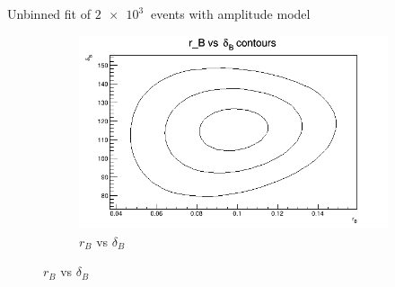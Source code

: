 \documentclass{beamer}
\begin{document}
\begin{frame}{Unbinned fit of $\SI{2e3}{}$ events with amplitude model}
\begin{figure}
\begin{subfigure}{0.46\textwidth}
      \includegraphics[width = 1.0\textwidth]{Contour_rB_vs_dB_1K.png}
      \caption{$r_B$ vs $\delta_B$}
    \end{subfigure}
  \end{figure}
\end{frame}
\end{document}
